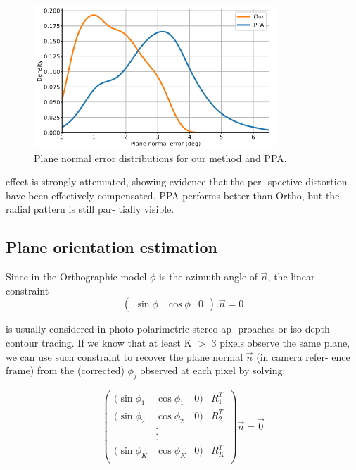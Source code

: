 \documentclass[letterpaper, 6 pt, journal, twoside]{IEEEtran}
\begin{document}
\begin{figure}
    \centering
    \includegraphics{images/Figure_3.png} 
    \caption{Plane normal error distributions for our method and PPA.}
    \label{fig:Fig3}
\end{figure}

effect is strongly attenuated, showing evidence that the per-
spective distortion have been effectively compensated. PPA
performs better than Ortho, but the radial pattern is still par-
tially visible.

\subsection{Plane orientation estimation}

    Since in the Orthographic model $\phi$ is the azimuth angle of $\Vec{n}$, the linear constraint 
\begin{equation}
        (\begin{array}{ccc} \sin{\phi} & \cos{\phi} & 0 \end{array}) . \Vec{n} = 0
\end{equation}

is usually considered in photo-polarimetric stereo ap-
proaches or iso-depth contour tracing. If we know that at
least K $>$ 3 pixels observe the same plane, we can use such
constraint to recover the plane normal $\Vec{n}$ (in camera refer-
ence frame) from the (corrected) $\phi_j$ observed at each pixel
by solving:

\begin{equation}
        (\begin{array}{cccc} 
        (\sin{\phi_1} & \cos{\phi_1} & 0 ) & R_1^T \\
        (\sin{\phi_2} & \cos{\phi_2} & 0 ) & R_2^T \\
        & . \\
        & . \\
        & . \\
        (\sin{\phi_K} & \cos{\phi_K} & 0 ) & R_K^T \\
        \end{array})  
        \Vec{n} = \Vec{0}
\end{equation}
\end{document}

